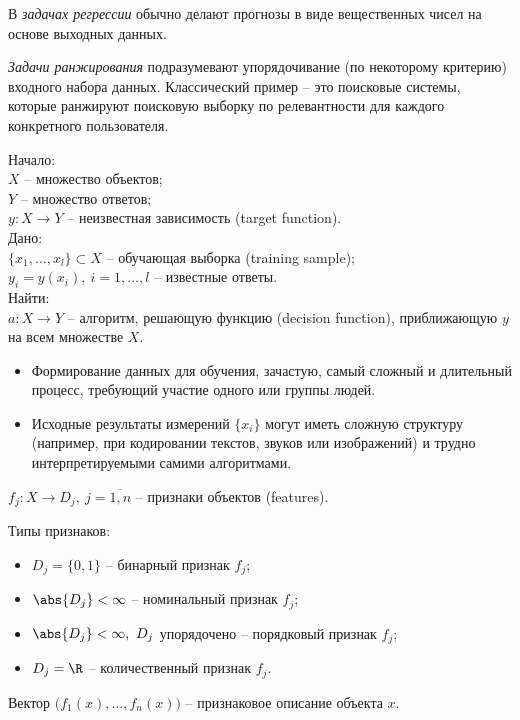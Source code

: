 \begin{definition}
	В \emph{задачах регрессии} обычно делают прогнозы в виде вещественных чисел на основе выходных данных.
\end{definition}

\begin{definition}
	\emph{Задачи ранжирования} подразумевают упорядочивание (по некоторому критерию) входного набора данных. Классический пример -- это поисковые системы, которые ранжируют поисковую выборку по релевантности для каждого конкретного пользователя.
\end{definition}

\begin{note}
	Начало: \\
	$X$ -- множество объектов; \\
	$Y$ -- множество ответов; \\
	$y: X \rightarrow Y$ -- неизвестная зависимость (target function). \\

	Дано: \\
	$\{x_1,\ldots,x_l\} \subset X$ -- обучающая выборка (training sample); \\
	$y_i = y(x_i), \ i = 1,\ldots ,l$ -- известные ответы. \\

	Найти: \\
	$a: X \rightarrow Y$ -- алгоритм, решающую функцию (decision function), приближающую $y$ на всем множестве $X$.
\end{note}

\begin{itemize}
	\item Формирование данных для обучения, зачастую, самый сложный и длительный процесс, требующий участие одного или группы людей.
	\item Исходные результаты измерений $\{x_i\}$ могут иметь сложную структуру (например, при кодировании текстов, звуков или изображений) и трудно интерпретируемыми самими алгоритмами.
\end{itemize}

\begin{note}
	$f_j: X \rightarrow D_j, \ j = \overline{1,n} $ -- признаки объектов (features).

	Типы признаков:
	\begin{itemize}
		\item $D_j = \{0,1\}$ -- бинарный признак $f_j$;
		\item $\abs{D_j} < \infty $ -- номинальный признак $f_j$;
		\item $\abs{D_j} < \infty , \ D_j$ упорядочено -- порядковый признак $f_j$;
		\item $D_j = \R$ -- количественный признак $f_j$.
	\end{itemize}

	Вектор $\big(f_1(x), \ldots , f_n(x)\big)$ -- признаковое описание объекта $x$.
\end{note}
